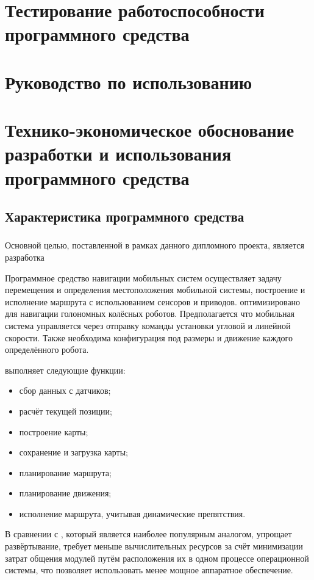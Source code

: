 \section{Тестирование работоспособности программного средства}

\section{Руководство по использованию}

\section{Технико-экономическое обоснование разработки и использования
программного средства}

\subsection{Характеристика программного средства}
\subsubsection{}
Основной целью, поставленной в рамках данного дипломного проекта, является
разработка 

Программное средство навигации мобильных систем осуществляет задачу перемещения
и определения местоположения мобильной системы, построение и исполнение 
маршрута с использованием сенсоров и приводов. \appname{} оптимизировано для
навигации голономных колёсных роботов. Предполагается что мобильная система 
управляется через отправку команды установки угловой и линейной скорости. 
Также необходима конфигурация под размеры и движение каждого определённого
робота.

\appname{} выполняет следующие функции:

\begin{itemize}
	\item сбор данных с датчиков;
	\item расчёт текущей позиции;
	\item построение карты;
	\item сохранение и загрузка карты;
	\item планирование маршрута;
	\item планирование движения;
	\item исполнение маршрута, учитывая динамические препятствия.
\end{itemize}


В сравнении с \ros{}, который является наиболее популярным аналогом, \appname{}
упрощает развёртывание, требует меньше вычислительных ресурсов за счёт
минимизации затрат общения модулей путём расположения их в одном процессе
операционной системы, что позволяет использовать менее мощное аппаратное
обеспечение.

